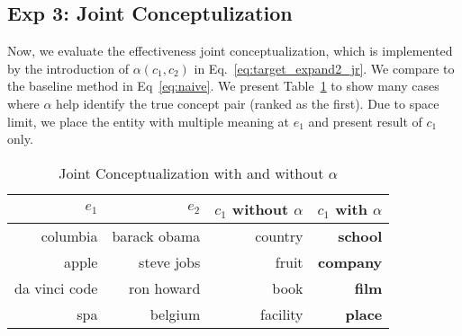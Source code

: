 \subsection{Exp 3: Joint Conceptulization}
Now, we evaluate the effectiveness joint conceptualization, which is implemented by the introduction of $\alpha(c_1,c_2)$ in Eq.~\ref{eq:target_expand2_jr}. We compare to the baseline method in Eq~\ref{eq:naive}.
We present Table~\ref{tab:expjc} to show many cases where $\alpha$ help identify the true concept pair (ranked as the first).
Due to space limit, we place the entity with multiple meaning at $e_1$ and present result of $c_1$ only.
\begin{table}[htbp]
  \centering
  \caption{Joint Conceptualization with and without $\alpha$}
    \begin{tabular}{rrrr}
    \toprule
    $e_1$                               & $e_2$                               & $c_1 $  without $\alpha$       & $c_1$  with $\alpha$ \\
    \midrule
    columbia                            & barack obama                        & country                    & \textbf{school }\\
    apple                               & steve jobs                          & fruit                & \textbf{company} \\
   da vinci code           & ron howard                       & book                     & \textbf{film} \\
    spa                                 & belgium                             & facility                  & \textbf{place} \\
    \bottomrule
    \end{tabular}%
  \label{tab:expjc}%
\end{table}%



